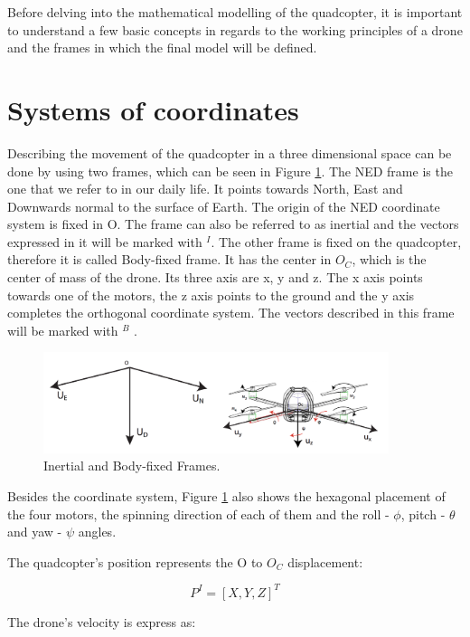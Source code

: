 Before delving into the mathematical modelling of the quadcopter, it is important to understand a few basic concepts in regards to the working principles of a drone and the frames in which the final model will be defined.

\section{Systems of coordinates} \label{2.1} 
Describing the movement of the quadcopter in a three dimensional space can be done by using two frames, which can be seen in Figure \ref{frames1}. The NED frame is the one that we refer to in our daily life. It points towards North, East and Downwards normal to the surface of Earth. The origin of the NED coordinate system is fixed in O. The frame can also be referred to as inertial and the vectors expressed in it will be marked with $^{I}$. The other frame is fixed on the quadcopter, therefore it is called Body-fixed frame. It has the center in $O_{C}$, which is the center of mass of the drone. Its three axis are x, y and z. The x axis points towards one of the motors, the z axis points to the ground and the y axis completes the orthogonal coordinate system. The vectors described in this frame will be marked with $^{B}$ \cite{Report1} \cite{Report2} .

\begin{figure}[H]
  \centering
    \includegraphics[width=0.9\textwidth]{images/frames1.png}
	\caption{Inertial and Body-fixed Frames.}
	\label{frames1}
\end{figure}

Besides the coordinate system, Figure \ref{frames1} also shows the hexagonal placement of the four motors, the spinning direction of each of them and the roll - $\phi$, pitch - $\theta$ and yaw - $\psi$ angles. 

The quadcopter's position represents the O to $O_{C}$ displacement:

\begin{equation}
	P^{I}=[X, Y, Z] ^{T}
\end{equation} 

The drone's velocity is express as:

